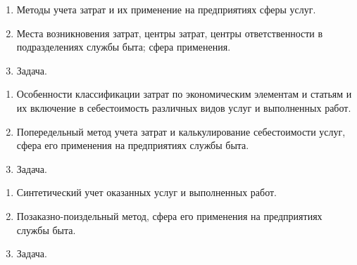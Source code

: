 \newpage


\shapkFull
\setcounter{zad}{0}

\begin{enumerate}
	\item Методы учета затрат и их применение на предприятиях сферы услуг.

	\item Места возникновения затрат, центры затрат, центры ответственности в подразделениях службы быта; сфера применения.

	\item Задача.
\end{enumerate}

\newpage


\shapkFull
\setcounter{zad}{0}

\begin{enumerate}
	\item Особенности классификации затрат по экономическим элементам и статьям и их включение в себестоимость различных видов услуг и выполненных работ.

	\item Попередельный метод учета затрат и калькулирование себестоимости услуг, сфера его применения на предприятиях службы быта.

	\item Задача.
\end{enumerate}

\newpage


\shapkFull
\setcounter{zad}{0}

\begin{enumerate}
	\item Синтетический учет оказанных услуг и выполненных работ.

	\item Позаказно-поиздельный метод, сфера его применения на предприятиях службы быта.

	\item Задача.
\end{enumerate}

\newpage